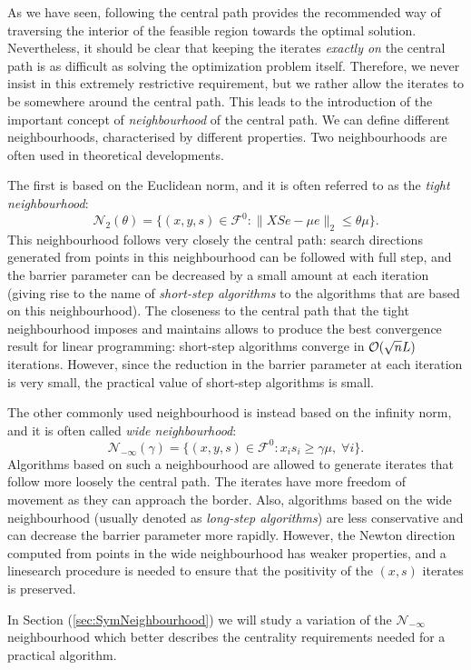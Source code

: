 As we have seen, following the central path provides the recommended
way of traversing the interior of the feasible region towards
the optimal solution. Nevertheless, it should be clear that keeping the
iterates {\em exactly on} the central path is as difficult as
solving the optimization problem itself.
%
Therefore, we never insist in this extremely restrictive requirement,
but we rather allow the iterates to be somewhere around the central path.
This leads to the introduction of the important concept of
{\em neighbourhood} of the central path. 
We can define different neighbourhoods, characterised
by different properties.
Two neighbourhoods are often used in theoretical developments.

The first is based on the Euclidean norm, and it is often referred
to as the {\em tight neighbourhood}:
\[
\mathcal{N}_2(\theta) = \{ (x,y,s) \in \mathcal{F}^0 :
                         \| XSe - \mu e \|_2 \le \theta\mu \}.
\]
This neighbourhood follows very closely the central path:
search directions generated from points in this neighbourhood can be 
followed with full step, and the barrier parameter can be decreased
by a small amount at each iteration (giving rise to the name
of {\em short-step algorithms} to the algorithms that are based on
this neighbourhood). 
The closeness to the central path that the tight neighbourhood
imposes and maintains allows to produce the best convergence result
for linear programming: short-step algorithms converge in 
$\mathcal{O}(\sqrt{n}L)$ iterations.
However, since the reduction in the barrier parameter at each iteration 
is very small, the practical value of short-step algorithms is small.

The other commonly used neighbourhood is instead based on the infinity norm, 
and it is often called {\em wide neighbourhood}:
\[
\mathcal{N}_{-\infty}(\gamma) = \{ (x,y,s) \in \mathcal{F}^0 :
                         x_is_i \ge \gamma\mu, \; \forall i \}.
\]
Algorithms based on such a neighbourhood are allowed to generate
iterates that follow more loosely the central path. The iterates 
have more freedom of movement as they can approach the border.
Also, algorithms based on the wide neighbourhood (usually denoted as
{\em long-step algorithms}) are less conservative and can decrease 
the barrier parameter more rapidly.
However, the Newton direction computed from points in the wide 
neighbourhood  has weaker properties, and a linesearch procedure is
needed to ensure that the positivity of the $(x,s)$ iterates is
preserved.

In Section (\ref{sec:SymNeighbourhood}) we will study a variation
of the $\mathcal{N}_{-\infty}$ neighbourhood which better describes
the centrality requirements needed for a practical algorithm.

